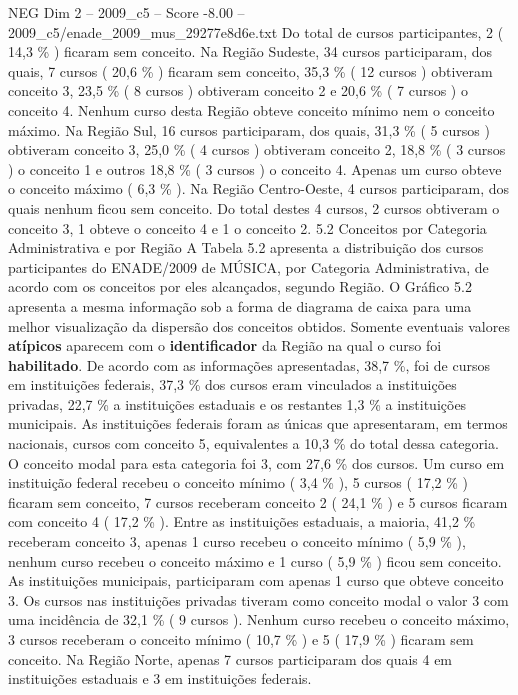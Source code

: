 \begin{textsample}{NEG Dim 2 – 2009\_c5 – Score -8.00 – 2009\_c5/enade\_2009\_mus\_29277e8d6e.txt}
Do total de cursos participantes, 2 ( 14,3 \% ) ficaram sem conceito.
Na Região Sudeste, 34 cursos participaram, dos quais, 7 cursos ( 20,6 \% ) ficaram sem conceito, 35,3 \% ( 12 cursos ) obtiveram conceito 3, 23,5 \% ( 8 cursos ) obtiveram conceito 2 e 20,6 \% ( 7 cursos ) o conceito 4.
Nenhum curso desta Região obteve conceito mínimo nem o conceito máximo.
Na Região Sul, 16 cursos participaram, dos quais, 31,3 \% ( 5 cursos ) obtiveram conceito 3, 25,0 \% ( 4 cursos ) obtiveram conceito 2, 18,8 \% ( 3 cursos ) o conceito 1 e outros 18,8 \% ( 3 cursos ) o conceito 4.
Apenas um curso obteve o conceito máximo ( 6,3 \% ).
Na Região Centro-Oeste, 4 cursos participaram, dos quais nenhum ficou sem conceito.
Do total destes 4 cursos, 2 cursos obtiveram o conceito 3, 1 obteve o conceito 4 e 1 o conceito 2. 5.2 Conceitos por Categoria Administrativa e por Região A Tabela 5.2 apresenta a distribuição dos cursos participantes do ENADE/2009 de MÚSICA, por Categoria Administrativa, de acordo com os conceitos por eles alcançados, segundo Região.
O Gráfico 5.2 apresenta a mesma informação sob a forma de diagrama de caixa para uma melhor visualização da dispersão dos conceitos obtidos.
Somente eventuais valores \textbf{atípicos} aparecem com o \textbf{identificador} da Região na qual o curso foi \textbf{habilitado}.
De acordo com as informações apresentadas, 38,7 \%, foi de cursos em instituições federais, 37,3 \% dos cursos eram vinculados a instituições privadas, 22,7 \% a instituições estaduais e os restantes 1,3 \% a instituições municipais.
As instituições federais foram as únicas que apresentaram, em termos nacionais, cursos com conceito 5, equivalentes a 10,3 \% do total dessa categoria.
O conceito modal para esta categoria foi 3, com 27,6 \% dos cursos.
Um curso em instituição federal recebeu o conceito mínimo ( 3,4 \% ), 5 cursos ( 17,2 \% ) ficaram sem conceito, 7 cursos receberam conceito 2 ( 24,1 \% ) e 5 cursos ficaram com conceito 4 ( 17,2 \% ).
Entre as instituições estaduais, a maioria, 41,2 \% receberam conceito 3, apenas 1 curso recebeu o conceito mínimo ( 5,9 \% ), nenhum curso recebeu o conceito máximo e 1 curso ( 5,9 \% ) ficou sem conceito.
As instituições municipais, participaram com apenas 1 curso que obteve conceito 3.
Os cursos nas instituições privadas tiveram como conceito modal o valor 3 com uma incidência de 32,1 \% ( 9 cursos ).
Nenhum curso recebeu o conceito máximo, 3 cursos receberam o conceito mínimo ( 10,7 \% ) e 5 ( 17,9 \% ) ficaram sem conceito.
Na Região Norte, apenas 7 cursos participaram dos quais 4 em instituições estaduais e 3 em instituições federais.

\end{textsample}
